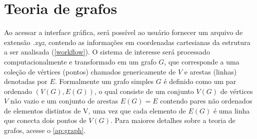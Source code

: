 




\section{Teoria de grafos}

Ao acessar a interface gráfica, será possível ao usuário fornecer um arquivo de extensão \textit{.xyz}, contendo as informações em coordenadas cartesianas da estrutura a ser analisada (\autoref{workflow}). O sistema de interesse será processado computacionalmente e transformado em um grafo $G$, que corresponde a uma coleção de vértices (pontos) chamados genericamente de $V$ e arestas (linhas) denotadas por $E$. Formalmente um grafo simples $G$ é definido como um par ordenado $(V(G), E(G))$, o qual consiste de um conjunto $V(G)$ de vértices $V$ não vazio e um conjunto de arestas $E(G) = E$ contendo pares não ordenados de elementos distintos de V, uma vez que cada elemento de $E(G)$ é uma linha que conecta dois pontos de $V(G)$. Para maiores detalhes sobre a teoria de grafos, acesse o \autoref{ap:graph}.

